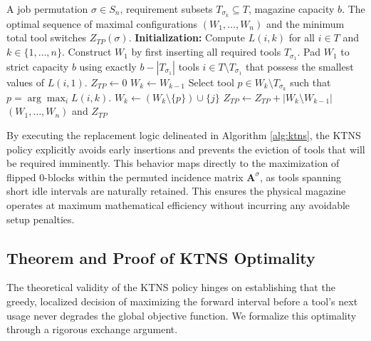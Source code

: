 \documentclass[11pt, a4paper]{book}
\begin{document}
	\begin{algorithm}[H]
		\caption{The Keep Tool Needed Soonest (KTNS) Policy}
		\label{alg:ktns}
		\begin{algorithmic}[1]
			\Require A job permutation $\sigma \in S_n$, requirement subsets $T_{\sigma_k} \subseteq T$, magazine capacity $b$.
			\Ensure The optimal sequence of maximal configurations $(W_1, \dots, W_n)$ and the minimum total tool switches $Z_{TP}(\sigma)$.
			\State \textbf{Initialization:} Compute $L(i, k)$ for all $i \in T$ and $k \in \{1, \dots, n\}$.
			\State Construct $W_1$ by first inserting all required tools $T_{\sigma_1}$.
			\State Pad $W_1$ to strict capacity $b$ using exactly $b - |T_{\sigma_1}|$ tools $i \in T \setminus T_{\sigma_1}$ that possess the smallest values of $L(i, 1)$.
			\State $Z_{TP} \gets 0$
			\State $W_k \gets W_{k-1}$ 
			\State Select tool $p \in W_k \setminus T_{\sigma_k}$ such that $p = \arg\max_{i} L(i, k)$. 
			\State $W_k \gets (W_k \setminus \{p\}) \cup \{j\}$
			\EndIf
			\EndFor
			\State $Z_{TP} \gets Z_{TP} + |W_k \setminus W_{k-1}|$ 
			\EndFor
			\State \Return $(W_1, \dots, W_n)$ and $Z_{TP}$
		\end{algorithmic}
	\end{algorithm}
	
	By executing the replacement logic delineated in Algorithm \ref{alg:ktns}, the KTNS policy explicitly avoids early insertions and prevents the eviction of tools that will be required imminently. This behavior maps directly to the maximization of flipped 0-blocks within the permuted incidence matrix $\mathbf{A}^\sigma$, as tools spanning short idle intervals are naturally retained. This ensures the physical magazine operates at maximum mathematical efficiency without incurring any avoidable setup penalties.
	
	\subsection{Theorem and Proof of KTNS Optimality}
	
	The theoretical validity of the KTNS policy hinges on establishing that the greedy, localized decision of maximizing the forward interval before a tool's next usage never degrades the global objective function. We formalize this optimality through a rigorous exchange argument.
	
\end{document}
